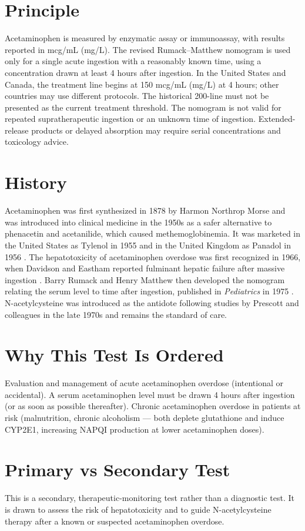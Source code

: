 \section*{Principle}
Acetaminophen is measured by enzymatic assay or immunoassay, with results reported in mcg/mL (mg/L). The revised Rumack--Matthew nomogram is used only for a single acute ingestion with a reasonably known time, using a concentration drawn at least 4 hours after ingestion. In the United States and Canada, the treatment line begins at 150 mcg/mL (mg/L) at 4 hours; other countries may use different protocols. The historical 200-line must not be presented as the current treatment threshold. The nomogram is not valid for repeated supratherapeutic ingestion or an unknown time of ingestion. Extended-release products or delayed absorption may require serial concentrations and toxicology advice.
\section*{History}
Acetaminophen was first synthesized in 1878 by Harmon Northrop Morse and was introduced into clinical medicine in the 1950s as a safer alternative to phenacetin and acetanilide, which caused methemoglobinemia. It was marketed in the United States as Tylenol in 1955 and in the United Kingdom as Panadol in 1956 \cite{prescott2000paracetamol}. The hepatotoxicity of acetaminophen overdose was first recognized in 1966, when Davidson and Eastham reported fulminant hepatic failure after massive ingestion \cite{davidson1966acute}. Barry Rumack and Henry Matthew then developed the nomogram relating the serum level to time after ingestion, published in \textit{Pediatrics} in 1975 \cite{rumack1975acetaminophen}. N-acetylcysteine was introduced as the antidote following studies by Prescott and colleagues in the late 1970s \cite{prescott1979intravenous} and remains the standard of care.
\section*{Why This Test Is Ordered}
Evaluation and management of acute acetaminophen overdose (intentional or accidental). A serum acetaminophen level must be drawn 4 hours after ingestion (or as soon as possible thereafter). Chronic acetaminophen overdose in patients at risk (malnutrition, chronic alcoholism --- both deplete glutathione and induce CYP2E1, increasing NAPQI production at lower acetaminophen doses).
\section*{Primary vs Secondary Test}
This is a secondary, therapeutic-monitoring test rather than a diagnostic test. It is drawn to assess the risk of hepatotoxicity and to guide N-acetylcysteine therapy after a known or suspected acetaminophen overdose.
